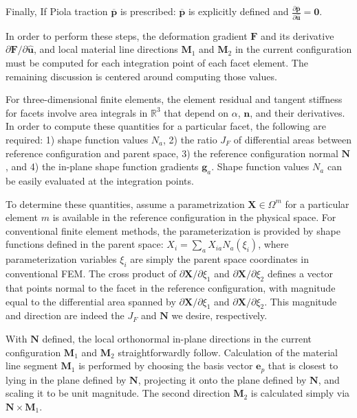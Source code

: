 Finally, If Piola traction $\bm {\overline{p}}$ is prescribed: $\bm {\overline{p}}$ is explicitly defined and $\frac{\partial \bm {\overline{p}}}{\partial {\hat {\bm{u}}}} = {\bm 0}$.

In order to perform these steps, the deformation gradient $\bm{F}$ and its derivative ${\partial \bm{F}}/{\partial \hat{\bm{u}}}$, and local material line directions $\bm{M}_1$ and $\bm{M}_2$ in the current configuration must be computed for each integration point of each facet element. The remaining discussion is centered around computing those values.

For three-dimensional finite elements, the element residual and tangent stiffness for facets involve area integrals in $\mathbb{R}^3$ that depend on $\alpha$, $\bm{n}$, and their derivatives. In order to compute these quantities for a particular facet, the following are required: 1) shape function values $N_a$, 2) the ratio $J_F$ of differential areas between reference configuration and parent space, 3) the reference configuration normal ${\bm {N}}$, and 4) the in-plane shape function gradients ${\bm {g}}_a$. Shape function values $N_a$ can be easily evaluated at the integration points. 

To determine these quantities, assume a parametrization $\mathbf{X} \in \Omega^m$ for a particular element $m$ is available in the reference configuration in the physical space. For conventional finite element methods, the parameterization is provided by shape functions defined in the parent space: ${X}_{i} = \sum\limits_{a}{X}_{ia}{N}_a(\xi_i)$, where parameterization variables $\xi_i$ are simply the parent space coordinates in conventional FEM. The cross product of ${\partial{\bm {X}}}/{\partial \xi_1}$ and ${\partial{\bm {X}}}/{\partial \xi_2}$ defines a vector that points normal to the facet in the reference configuration, with magnitude equal to the differential area spanned by ${\partial{\bm {X}}}/{\partial \xi_1}$ and ${\partial{\bm {X}}}/{\partial \xi_2}$. This magnitude and direction are indeed the $J_F$ and ${\bm {N}}$ we desire, respectively.

With $\bm{N}$ defined, the local orthonormal in-plane directions in the current configuration $\bm{M}_1$ and $\bm{M}_2$ straightforwardly follow. Calculation of the material line segment ${\bm {M}}_1$ is performed by choosing the basis vector ${\bm {e}}_p$ that is closest to lying in the plane defined by ${\bm N}$, projecting it onto the plane defined by $\bm{N}$, and scaling it to be unit magnitude. The second direction ${\bm M}_2$ is calculated simply via ${\bm {N}} \times {\bm {M}}_1$.

